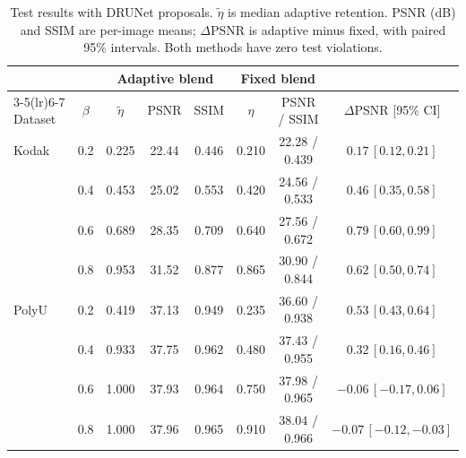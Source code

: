\begin{table}[t]
\centering
\caption{Test results with DRUNet proposals. $\widetilde\eta$ is median adaptive retention. PSNR (dB) and SSIM are per-image means; $\Delta$PSNR is adaptive minus fixed, with paired 95\% intervals. Both methods have zero test violations.}
\label{tab:main}
\begin{tabular*}{\textwidth}{@{\extracolsep{\fill}}lccccccc@{}}
\toprule
&&\multicolumn{3}{c}{Adaptive blend}&\multicolumn{2}{c}{Fixed blend}&\\
\cmidrule(lr){3-5}\cmidrule(lr){6-7}
Dataset&$\beta$&$\widetilde\eta$&PSNR&SSIM&$\eta$&PSNR / SSIM&$\Delta$PSNR [95\% CI]\\
\midrule
Kodak&0.2&0.225&22.44&0.446&0.210&22.28 / 0.439&$0.17\,[0.12,0.21]$\\
&0.4&0.453&25.02&0.553&0.420&24.56 / 0.533&$0.46\,[0.35,0.58]$\\
&0.6&0.689&28.35&0.709&0.640&27.56 / 0.672&$0.79\,[0.60,0.99]$\\
&0.8&0.953&31.52&0.877&0.865&30.90 / 0.844&$0.62\,[0.50,0.74]$\\
\midrule
PolyU&0.2&0.419&37.13&0.949&0.235&36.60 / 0.938&$0.53\,[0.43,0.64]$\\
&0.4&0.933&37.75&0.962&0.480&37.43 / 0.955&$0.32\,[0.16,0.46]$\\
&0.6&1.000&37.93&0.964&0.750&37.98 / 0.965&$-0.06\,[-0.17,0.06]$\\
&0.8&1.000&37.96&0.965&0.910&38.04 / 0.966&$-0.07\,[-0.12,-0.03]$\\
\bottomrule
\end{tabular*}
\end{table}
